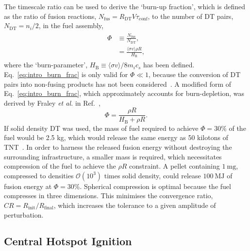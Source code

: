 The timescale ratio can be used to derive the `burn-up fraction', which is defined as the ratio of fusion reactions, $N_{\text{fus}} = R_{\text{DT}}V\tau_{\text{conf}}$, to the number of DT pairs, $N_{\text{DT}}=n_i/2$, in the fuel assembly,
\begin{align}
    \label{eq:intro_burn_frac}
    \begin{split}
        \Phi &\equiv \frac{N_{\text{fus}}}{N_{\text{DT}}},\\
        &= \frac{\langle \sigma v \rangle \rho R}{H_{\text{B}}},
    \end{split}
\end{align}
where the `burn-parameter', $H_{\text{B}} \equiv \langle \sigma v \rangle / 8 m_i c_s$ has been defined.
Eq.~\ref{eq:intro_burn_frac} is only valid for $\Phi \ll 1$, because the conversion of DT pairs into non-fusing products has not been considered~\cite{atzeni_physics_2004}.
A modified form of Eq.~\ref{eq:intro_burn_frac}, which approximately accounts for burn-depletion, was derived by Fraley \textit{et al.} in Ref.~\cite{fraley_thermonuclear_1974},
\begin{equation}
    \Phi = \frac{\rho R}{H_{\text{B}} + \rho R}.
\end{equation}
If solid density DT was used, the mass of fuel required to achieve $\Phi=30\%$ of the fuel would be 2.5 kg, which would release the same energy as 50 kilotons of TNT~\cite{crilly_simulation_2020}.
In order to harness the released fusion energy without destroying the surrounding infrastructure, a smaller mass is required, which necessitates compression of the fuel to achieve the $\rho R$ constraint.
A pellet containing $1\ \text{mg}$, compressed to densities $\mathcal{O}(10^3)$ times solid density, could release $100\ \text{MJ}$ of fusion energy at $\Phi=30\%$.
Spherical compression is optimal because the fuel compresses in three dimensions.
This minimises the convergence ratio, $CR = R_{\text{init}}/R_{\text{final}}$, which increases the tolerance to a given amplitude of perturbation.

\subsection{Central Hotspot Ignition}%
\label{sec:intro_centralhotspot}

